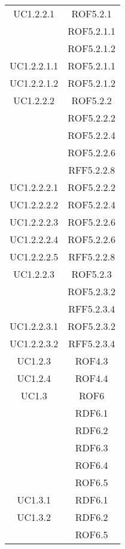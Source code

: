 \begin{longtable}{|c|c|}
\midrule
UC1.2.2.1
& ROF5.2.1\\
& ROF5.2.1.1\\
& ROF5.2.1.2\\

\midrule
UC1.2.2.1.1
& ROF5.2.1.1\\

\midrule
UC1.2.2.1.2
& ROF5.2.1.2\\

\midrule
UC1.2.2.2
& ROF5.2.2\\
& ROF5.2.2.2\\
& ROF5.2.2.4\\
& ROF5.2.2.6\\
& RFF5.2.2.8\\

\midrule
UC1.2.2.2.1
& ROF5.2.2.2\\

\midrule
UC1.2.2.2.2
& ROF5.2.2.4\\

\midrule
UC1.2.2.2.3
& ROF5.2.2.6\\

\midrule
UC1.2.2.2.4
& ROF5.2.2.6\\

\midrule
UC1.2.2.2.5
& RFF5.2.2.8\\

\midrule
UC1.2.2.3
& ROF5.2.3\\
& ROF5.2.3.2\\
& RFF5.2.3.4\\

\midrule
UC1.2.2.3.1
& ROF5.2.3.2\\

\midrule
UC1.2.2.3.2
& RFF5.2.3.4\\

\midrule
UC1.2.3
& ROF4.3\\

\midrule
UC1.2.4
& ROF4.4\\

\midrule
UC1.3
& ROF6\\
& RDF6.1\\
& RDF6.2\\
& RDF6.3\\
& ROF6.4\\
& ROF6.5\\

\midrule
UC1.3.1
& RDF6.1\\

\midrule
UC1.3.2
& RDF6.2\\
& ROF6.5\\


\end{longtable}
